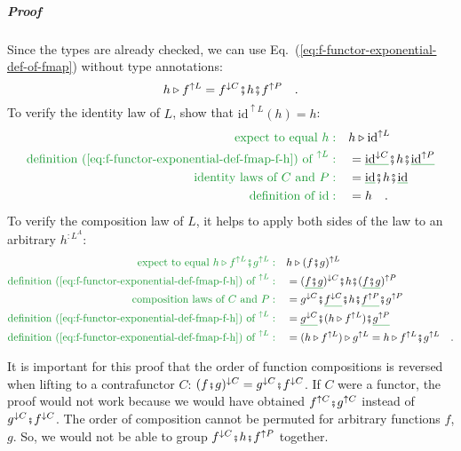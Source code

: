 \subparagraph{Proof}

Since the types are already checked, we can use Eq.~(\ref{eq:f-functor-exponential-def-of-fmap})
without type annotations:
\begin{equation}
h\triangleright f^{\uparrow L}=f^{\downarrow C}\bef h\bef f^{\uparrow P}\quad.\label{eq:f-functor-exponential-def-fmap-f-h}
\end{equation}
To verify the identity law of $L$, show that $\text{id}^{\uparrow L}(h)=h$:
\begin{align*}
{\color{greenunder}\text{expect to equal }h:}\quad & h\triangleright\text{id}^{\uparrow L}\\
{\color{greenunder}\text{definition (\ref{eq:f-functor-exponential-def-fmap-f-h}) of }^{\uparrow L}:}\quad & =\gunderline{\text{id}^{\downarrow C}}\bef h\bef\gunderline{\text{id}^{\uparrow P}}\\
{\color{greenunder}\text{identity laws of }C\text{ and }P:}\quad & =\gunderline{\text{id}}\bef h\bef\gunderline{\text{id}}\\
{\color{greenunder}\text{definition of }\text{id}:}\quad & =h\quad.
\end{align*}
To verify the composition law of $L$, it helps to apply both sides
of the law to an arbitrary $h^{:L^{A}}$:
\begin{align*}
{\color{greenunder}\text{expect to equal }h\triangleright f^{\uparrow L}\bef g^{\uparrow L}:}\quad & h\triangleright(f\bef g)^{\uparrow L}\\
{\color{greenunder}\text{definition (\ref{eq:f-functor-exponential-def-fmap-f-h}) of }^{\uparrow L}:}\quad & =(\gunderline{f\bef g})^{\downarrow C}\bef h\bef(\gunderline{f\bef g})^{\uparrow P}\\
{\color{greenunder}\text{composition laws of }C\text{ and }P:}\quad & =g^{\downarrow C}\bef\gunderline{f^{\downarrow C}}\bef h\bef\gunderline{f^{\uparrow P}}\bef g^{\uparrow P}\\
{\color{greenunder}\text{definition (\ref{eq:f-functor-exponential-def-fmap-f-h}) of }^{\uparrow L}:}\quad & =\gunderline{g^{\downarrow C}}\bef(h\triangleright f^{\uparrow L})\bef\gunderline{g^{\uparrow P}}\\
{\color{greenunder}\text{definition (\ref{eq:f-functor-exponential-def-fmap-f-h}) of }^{\uparrow L}:}\quad & =(h\triangleright f^{\uparrow L})\triangleright g^{\uparrow L}=h\triangleright f^{\uparrow L}\bef g^{\uparrow L}\quad.
\end{align*}

It is important for this proof that the order of function compositions
is reversed when lifting to a contrafunctor $C$: $(f\bef g)^{\downarrow C}=g^{\downarrow C}\bef f^{\downarrow C}$.
If $C$ were a functor, the proof would not work because we would
have obtained $f^{\uparrow C}\bef g^{\uparrow C}$ instead of $g^{\downarrow C}\bef f^{\downarrow C}$.
The order of composition cannot be permuted for arbitrary functions
$f$, $g$. So, we would not be able to group $f^{\downarrow C}\bef h\bef f^{\uparrow P}$
together.

